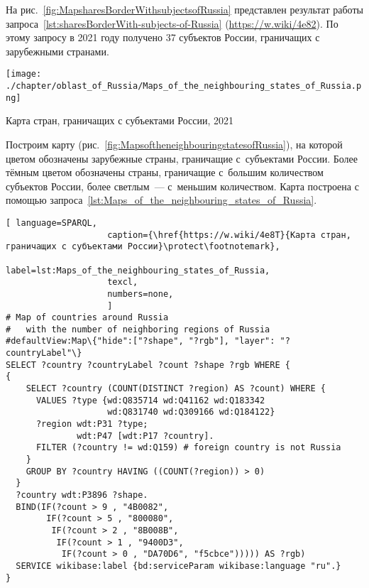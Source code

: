 На рис.~\ref{fig:MapsharesBorderWithsubjectsofRussia} представлен 
результат работы 
запроса~\ref{lst:sharesBorderWith-subjects-of-Russia} (\href{https://w.wiki/4e82}{https://w.wiki/4e82}).
По этому запросу в 2021 году получено 37 субъектов России, граничащих с зарубежными странами. 



\newpage
\begin{marginfigure}[0\baselineskip]
	\texttt{[image: ./chapter/oblast\_of\_Russia/Maps\_of\_the\_neighbouring\_states\_of\_Russia.png]}
	\caption[Карта стран, граничащих с Россией, 2021 год.]{Карта стран, граничащих с субъектами России, 2021}%
      \label{fig:MapsoftheneighbouringstatesofRussia}%
\end{marginfigure} 
Построим карту (рис.~\ref{fig:MapsoftheneighbouringstatesofRussia}), 
на которой цветом обозначены зарубежные страны, 
граничащие с~субъектами России. 
Более тёмным цветом обозначены страны, 
граничащие с~большим количеством субъектов России, 
более светлым~--- с~меньшим количеством. 
Карта построена с помощью запроса~\protect\ref{lst:Maps_of_the_neighbouring_states_of_Russia}.

\lstset{numbers=left, firstnumber=1, frame=single}
\begin{lstlisting}[ language=SPARQL, 
                    caption={\href{https://w.wiki/4e8T}{Карта стран, граничащих с субъектами России}\protect\footnotemark},
                    label=lst:Maps_of_the_neighbouring_states_of_Russia,
                    texcl,
                    numbers=none,
                    ]
# Map of countries around Russia 
#   with the number of neighboring regions of Russia
#defaultView:Map\{"hide":["?shape", "?rgb"], "layer": "?countryLabel"\}
SELECT ?country ?countryLabel ?count ?shape ?rgb WHERE {
{
    SELECT ?country (COUNT(DISTINCT ?region) AS ?count) WHERE {
      VALUES ?type {wd:Q835714 wd:Q41162 wd:Q183342 
                    wd:Q831740 wd:Q309166 wd:Q184122}
      ?region wdt:P31 ?type;
              wdt:P47 [wdt:P17 ?country].
      FILTER (?country != wd:Q159) # foreign country is not Russia
    }
    GROUP BY ?country HAVING ((COUNT(?region)) > 0)
  }
  ?country wdt:P3896 ?shape.
  BIND(IF(?count > 9 , "4B0082", 
        IF(?count > 5 , "800080", 
         IF(?count > 2 , "8B008B", 
          IF(?count > 1 , "9400D3", 
           IF(?count > 0 , "DA70D6", "f5cbce"))))) AS ?rgb)
  SERVICE wikibase:label {bd:serviceParam wikibase:language "ru".}
}
\end{lstlisting}%



